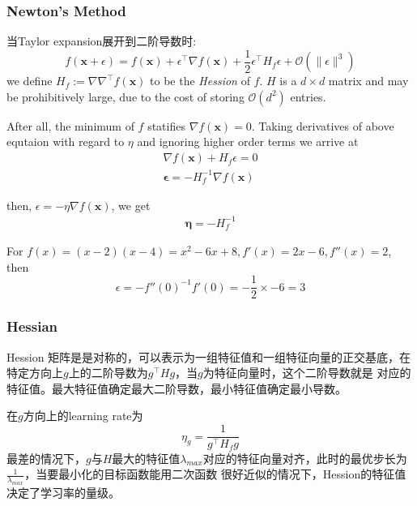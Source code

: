 \subsubsection{Newton's Method}
当Taylor expansion展开到二阶导数时:
\begin{equation}
    f(\mathbf{x} + \epsilon) = f(\mathbf{x}) + \epsilon^\top \nabla f(\mathbf{x}) + \frac{1}{2} \epsilon^\top H_f \epsilon
    + \mathcal{O}(\|\epsilon\|^3)
\end{equation}
we define $H_f := \nabla \nabla ^\top f(\mathbf{x})$ to be the \textit{Hession} of $f$. $H$ is a $d \times  d$ matrix and may be
prohibitively large, due to the cost of storing $\mathcal{O}(d^2)$ entries.

\par

After all, the minimum of $f$ statifies $\nabla f(\mathbf{x}) = 0$.  Taking derivatives of above equtaion with regard to $\eta$ and
ignoring higher order terms we arrive at
\begin{equation}
    \begin{split}
        \nabla f(\mathbf{x}) + H_f \epsilon = 0 \\
        \mathbf{\epsilon} = -H_f^{-1} \nabla f(\mathbf{x})
    \end{split}
\end{equation}

then, $\epsilon = -\eta \nabla f(\mathbf{x})$, we get
\begin{equation}
    \begin{split}
        \mathbf{\eta} = -H_f^{-1}
    \end{split}
\end{equation}

For $f(x) = (x-2)(x-4) = x^2 - 6x + 8, f'(x) = 2x - 6, f''(x) = 2$, then
\begin{equation}
    \epsilon = -f''(0)^{-1} f'(0) = -\frac{1}{2} \times -6 = 3
\end{equation}

\subsubsection{Hessian}
Hession 矩阵是是对称的，可以表示为一组特征值和一组特征向量的正交基底，在特定方向上$g$上的二阶导数为$g^\top H g$，当$g$为特征向量时，这个二阶导数就是
对应的特征值。最大特征值确定最大二阶导数，最小特征值确定最小导数。\par
在$g$方向上的learning rate为
\begin{equation}
    \eta_g = \frac{1}{g^\top H_f g}
\end{equation}
最差的情况下，$g$与$H$最大的特征值$\lambda_{max}$对应的特征向量对齐，此时的最优步长为$\frac{1}{\lambda_{max}}$，当要最小化的目标函数能用二次函数
很好近似的情况下，Hession的特征值决定了学习率的量级。

